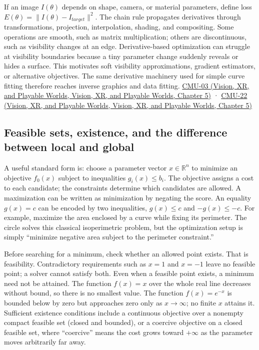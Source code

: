 If an image \(I(\theta)\) depends on shape, camera, or material parameters, define loss \(E(\theta)=\|I(\theta)-I_{target}\|^2\). The chain rule propagates derivatives through transformations, projection, interpolation, shading, and compositing. Some operations are smooth, such as matrix multiplication; others are discontinuous, such as visibility changes at an edge. Derivative-based optimization can struggle at visibility boundaries because a tiny parameter change suddenly reveals or hides a surface. This motivates soft visibility approximations, gradient estimators, or alternative objectives. The same derivative machinery used for simple curve fitting therefore reaches inverse graphics and data fitting. \href{../07-Vision-XR-and-Playable-Worlds/main.pdf\#nameddest=04-visual-computing-ii-ch036-cmu-03---vector-calculus-preview}{CMU-03 (Vision, XR, and Playable Worlds, Vision, XR, and Playable Worlds, Chapter 5)} · \href{../07-Vision-XR-and-Playable-Worlds/main.pdf\#nameddest=04-visual-computing-ii-ch036-cmu-22---optimization}{CMU-22 (Vision, XR, and Playable Worlds, Vision, XR, and Playable Worlds, Chapter 5)}

\subsection{Feasible sets, existence, and the difference between local and global}\label{04-visual-computing-ii-ch029-feasible-sets-existence-and-the-difference-between-local-and-global}

A useful standard form is: choose a parameter vector \(x\in\mathbb R^n\) to minimize an objective \(f_0(x)\) subject to inequalities \(g_i(x)\le b_i\). The objective assigns a cost to each candidate; the constraints determine which candidates are allowed. A maximization can be written as minimization by negating the score. An equality \(g(x)=c\) can be encoded by two inequalities, \(g(x)\le c\) and \(-g(x)\le -c\). For example, maximize the area enclosed by a curve while fixing its perimeter. The circle solves this classical isoperimetric problem, but the optimization setup is simply ``minimize negative area subject to the perimeter constraint.''

Before searching for a minimum, check whether an allowed point exists. That is feasibility. Contradictory requirements such as \(x=1\) and \(x=-1\) leave no feasible point; a solver cannot satisfy both. Even when a feasible point exists, a minimum need not be attained. The function \(f(x)=x\) over the whole real line decreases without bound, so there is no smallest value. The function \(f(x)=e^{-x}\) is bounded below by zero but approaches zero only as \(x\to\infty\); no finite \(x\) attains it. Sufficient existence conditions include a continuous objective over a nonempty compact feasible set (closed and bounded), or a coercive objective on a closed feasible set, where ``coercive'' means the cost grows toward \(+\infty\) as the parameter moves arbitrarily far away.

